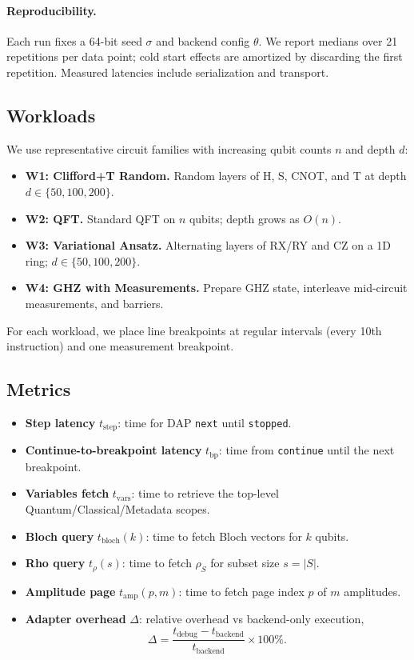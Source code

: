 \documentclass[12pt]{article}
\begin{document}
\begin{itemize}
\paragraph{Reproducibility.}
Each run fixes a 64-bit seed $\sigma$ and backend config $\theta$. We report medians over 21 repetitions per data point; cold start effects are amortized by discarding the first repetition. Measured latencies include serialization and transport.

\subsection{Workloads}

We use representative circuit families with increasing qubit counts $n$ and depth $d$:

\begin{itemize}
  \item \textbf{W1: Clifford+T Random.} Random layers of H, S, CNOT, and T at depth $d \in \{50, 100, 200\}$.
  \item \textbf{W2: QFT.} Standard QFT on $n$ qubits; depth grows as $O(n)$.
  \item \textbf{W3: Variational Ansatz.} Alternating layers of RX/RY and CZ on a 1D ring; $d \in \{50, 100, 200\}$.
  \item \textbf{W4: GHZ with Measurements.} Prepare GHZ state, interleave mid-circuit measurements, and barriers.
\end{itemize}

For each workload, we place line breakpoints at regular intervals (every 10th instruction) and one measurement breakpoint.

\subsection{Metrics}

\begin{itemize}
  \item \textbf{Step latency} $t_{\mathrm{step}}$: time for DAP \texttt{next} until \texttt{stopped}.
  \item \textbf{Continue-to-breakpoint latency} $t_{\mathrm{bp}}$: time from \texttt{continue} until the next breakpoint.
  \item \textbf{Variables fetch} $t_{\mathrm{vars}}$: time to retrieve the top-level Quantum/Classical/Metadata scopes.
  \item \textbf{Bloch query} $t_{\mathrm{bloch}}(k)$: time to fetch Bloch vectors for $k$ qubits.
  \item \textbf{Rho query} $t_{\rho}(s)$: time to fetch $\rho_S$ for subset size $s = |S|$.
  \item \textbf{Amplitude page} $t_{\mathrm{amp}}(p,m)$: time to fetch page index $p$ of $m$ amplitudes.
  \item \textbf{Adapter overhead} $\Delta$: relative overhead vs backend-only execution,
  \[
  \Delta = \frac{t_{\mathrm{debug}} - t_{\mathrm{backend}}}{t_{\mathrm{backend}}} \times 100\%.
  \]
\end{itemize}


\end{itemize}
\end{document}
